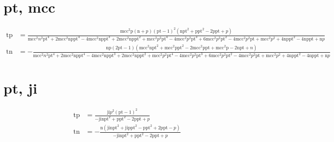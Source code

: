 \documentclass[3p,times]{elsarticle}
\begin{document}
\begin{footnotesize}
\begin{landscape}
\section{pt, mcc}
\begin{align}
\mathrm{tp} &= \frac{\mathrm{mcc}^{2} \mathrm{p} \left(\mathrm{n} + p\right) \left(\mathrm{pt} - 1\right)^{2} \left(\mathrm{n} \mathrm{pt}^{2} + \mathrm{p} \mathrm{pt}^{2} - 2 \mathrm{p} \mathrm{pt} + p\right)}{\mathrm{mcc}^{2} n^{2} \mathrm{pt}^{4} + 2 \mathrm{mcc}^{2} \mathrm{n} \mathrm{p} \mathrm{pt}^{4} - 4 \mathrm{mcc}^{2} \mathrm{n} \mathrm{p} \mathrm{pt}^{3} + 2 \mathrm{mcc}^{2} \mathrm{n} \mathrm{p} \mathrm{pt}^{2} + \mathrm{mcc}^{2} p^{2} \mathrm{pt}^{4} - 4 \mathrm{mcc}^{2} p^{2} \mathrm{pt}^{3} + 6 \mathrm{mcc}^{2} p^{2} \mathrm{pt}^{2} - 4 \mathrm{mcc}^{2} p^{2} \mathrm{pt} + \mathrm{mcc}^{2} p^{2} + 4 \mathrm{n} \mathrm{p} \mathrm{pt}^{2} - 4 \mathrm{n} \mathrm{p} \mathrm{pt} + \mathrm{n} p}\\
\mathrm{tn} &= - \frac{\mathrm{n} \mathrm{p} \left(2 \mathrm{pt} - 1\right) \left(\mathrm{mcc}^{2} \mathrm{n} \mathrm{pt}^{2} + \mathrm{mcc}^{2} \mathrm{p} \mathrm{pt}^{2} - 2 \mathrm{mcc}^{2} \mathrm{p} \mathrm{pt} + \mathrm{mcc}^{2} \mathrm{p} - 2 \mathrm{n} \mathrm{pt} + n\right)}{\mathrm{mcc}^{2} n^{2} \mathrm{pt}^{4} + 2 \mathrm{mcc}^{2} \mathrm{n} \mathrm{p} \mathrm{pt}^{4} - 4 \mathrm{mcc}^{2} \mathrm{n} \mathrm{p} \mathrm{pt}^{3} + 2 \mathrm{mcc}^{2} \mathrm{n} \mathrm{p} \mathrm{pt}^{2} + \mathrm{mcc}^{2} p^{2} \mathrm{pt}^{4} - 4 \mathrm{mcc}^{2} p^{2} \mathrm{pt}^{3} + 6 \mathrm{mcc}^{2} p^{2} \mathrm{pt}^{2} - 4 \mathrm{mcc}^{2} p^{2} \mathrm{pt} + \mathrm{mcc}^{2} p^{2} + 4 \mathrm{n} \mathrm{p} \mathrm{pt}^{2} - 4 \mathrm{n} \mathrm{p} \mathrm{pt} + \mathrm{n} p}
\end{align}
\section{pt, ji}
\begin{align}
\mathrm{tp} &= \frac{\mathrm{ji} p^{2} \left(\mathrm{pt} - 1\right)^{2}}{- \mathrm{ji} \mathrm{n} \mathrm{pt}^{2} + \mathrm{p} \mathrm{pt}^{2} - 2 \mathrm{p} \mathrm{pt} + p}\\
\mathrm{tn} &= - \frac{\mathrm{n} \left(\mathrm{ji} \mathrm{n} \mathrm{pt}^{2} + \mathrm{ji} \mathrm{p} \mathrm{pt}^{2} - \mathrm{p} \mathrm{pt}^{2} + 2 \mathrm{p} \mathrm{pt} - p\right)}{- \mathrm{ji} \mathrm{n} \mathrm{pt}^{2} + \mathrm{p} \mathrm{pt}^{2} - 2 \mathrm{p} \mathrm{pt} + p}
\end{align}

\end{landscape}
\end{footnotesize}
\end{document}
